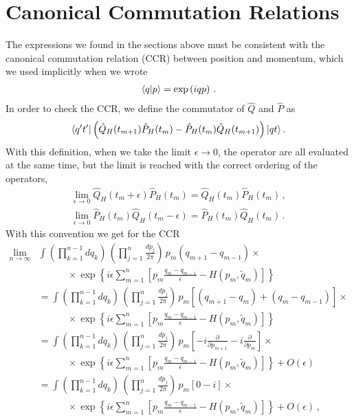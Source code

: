 \section{Canonical Commutation Relations}
\label{sec:CCR}
The expressions we found in the sections above must be consistent with the canonical 
commutation relation (CCR) between position and momentum, which we used implicitly 
when we wrote 
\begin{align}
  \langle q | p \rangle = \exp \left(i q p \right)\, .
\end{align}
In order to check the CCR, we define the commutator of $\hat{Q}$ and $\hat{P}$ as
\begin{align}
  \label{eq:CCRDef}
  \langle q't' | \left(\hat{Q}_H(t_{m+1}) \hat{P}_H(t_m) - \hat{P}_H(t_m) \hat{Q}_H(t_{m+1})\right) | qt \rangle\, .
\end{align}
With this definition, when we take the limit $\epsilon\to 0$, the operator are all evaluated at the same 
time, but the limit is reached with the correct ordering of the operators, 
\begin{align}
  \lim_{\epsilon\to 0} \hat{Q}_H(t_m+\epsilon) \hat{P}_H(t_m) = \hat{Q}_H(t_m) \hat{P}_H(t_m)\, , \\
  \lim_{\epsilon\to 0} \hat{P}_H(t_m) \hat{Q}_H(t_m-\epsilon) = \hat{P}_H(t_m) \hat{Q}_H(t_m)\, . 
\end{align}
With this convention we get for the CCR
\begin{align}
  \lim_{n\to\infty} & \int 
  \left(\prod_{k=1}^{n-1}dq_k\right)\, 
  \left(\prod_{j=1}^{n} \frac{dp_j}{2\pi}\right)\, p_{m} \left(q_{m+1}-q_{m-1}\right) \times \nonumber\\
  &\qquad\quad \times \exp \left\{
    i\epsilon \sum_{m=1}^{n} \left[
    p_m \frac{q_m-q_{m-1}}{\epsilon} - H\left(p_m, 
    \tilde{q}_m \right)
    \right]
    \right\} \\
  &= \int 
  \left(\prod_{k=1}^{n-1}dq_k\right)\, 
  \left(\prod_{j=1}^{n} \frac{dp_j}{2\pi}\right)\, 
  p_{m} \left[\left(q_{m+1}-q_{m}\right) + \left(q_{m}-q_{m-1}\right)\right] \times \nonumber\\
  & \qquad \quad \times \exp \left\{
    i\epsilon \sum_{m=1}^{n} \left[
    p_m \frac{q_m-q_{m-1}}{\epsilon} - H\left(p_m, 
    \tilde{q}_m \right)
    \right]
    \right\} \\ 
  &= \int 
  \left(\prod_{k=1}^{n-1}dq_k\right)\, 
  \left(\prod_{j=1}^{n} \frac{dp_j}{2\pi}\right)\, 
  p_{m} \left[-i \frac{\partial}{\partial p_{m+1}} -i \frac{\partial}{\partial p_{m}}\right] \times \nonumber\\
  & \qquad \quad \times \exp \left\{
      i\epsilon \sum_{m=1}^{n} \left[
      p_m \frac{q_m-q_{m-1}}{\epsilon} - H\left(p_m, 
      \tilde{q}_m \right)
      \right]
      \right\} + O(\epsilon) \\
  &= \int 
  \left(\prod_{k=1}^{n-1}dq_k\right)\, 
  \left(\prod_{j=1}^{n} \frac{dp_j}{2\pi}\right)\, 
  p_{m} \left[ 0 - i \right] \times \nonumber\\
  & \qquad \quad \times \exp \left\{
        i\epsilon \sum_{m=1}^{n} \left[
        p_m \frac{q_m-q_{m-1}}{\epsilon} - H\left(p_m, 
        \tilde{q}_m \right)
        \right]
        \right\} + O(\epsilon)\, ,
\end{align}

